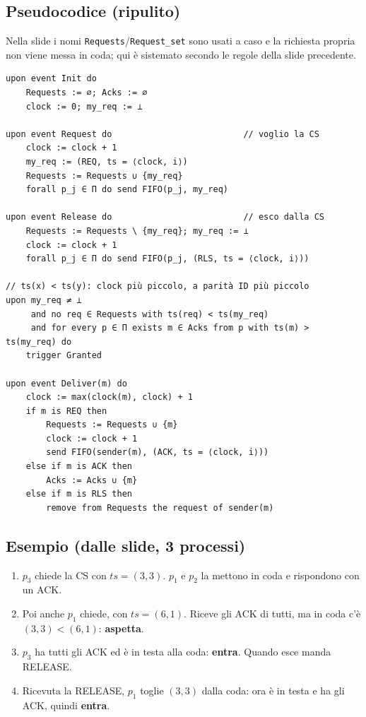 \subsection{Pseudocodice (ripulito)}

Nella slide i nomi \texttt{Requests}/\texttt{Request\_set} sono usati a caso e la richiesta propria non viene messa in coda; qui è sistemato secondo le regole della slide precedente.

\begin{verbatim}
upon event Init do
    Requests := ∅; Acks := ∅
    clock := 0; my_req := ⊥

upon event Request do                          // voglio la CS
    clock := clock + 1
    my_req := (REQ, ts = ⟨clock, i⟩)
    Requests := Requests ∪ {my_req}
    forall p_j ∈ Π do send FIFO(p_j, my_req)

upon event Release do                          // esco dalla CS
    Requests := Requests \ {my_req}; my_req := ⊥
    clock := clock + 1
    forall p_j ∈ Π do send FIFO(p_j, (RLS, ts = ⟨clock, i⟩))

// ts(x) < ts(y): clock più piccolo, a parità ID più piccolo
upon my_req ≠ ⊥
     and no req ∈ Requests with ts(req) < ts(my_req)
     and for every p ∈ Π exists m ∈ Acks from p with ts(m) > ts(my_req) do
    trigger Granted

upon event Deliver(m) do
    clock := max(clock(m), clock) + 1
    if m is REQ then
        Requests := Requests ∪ {m}
        clock := clock + 1
        send FIFO(sender(m), (ACK, ts = ⟨clock, i⟩))
    else if m is ACK then
        Acks := Acks ∪ {m}
    else if m is RLS then
        remove from Requests the request of sender(m)
\end{verbatim}

\subsection{Esempio (dalle slide, 3 processi)}

\begin{enumerate}
\def\labelenumi{\arabic{enumi}.}
\tightlist
\item
  \(p_3\) chiede la CS con \(ts = (3, 3)\). \(p_1\) e \(p_2\) la mettono in coda e rispondono con un ACK.
\item
  Poi anche \(p_1\) chiede, con \(ts = (6, 1)\). Riceve gli ACK di tutti, ma in coda c'è \((3, 3) < (6, 1)\): \textbf{aspetta}.
\item
  \(p_3\) ha tutti gli ACK ed è in testa alla coda: \textbf{entra}. Quando esce manda RELEASE.
\item
  Ricevuta la RELEASE, \(p_1\) toglie \((3,3)\) dalla coda: ora è in testa e ha gli ACK, quindi \textbf{entra}.
\end{enumerate}

